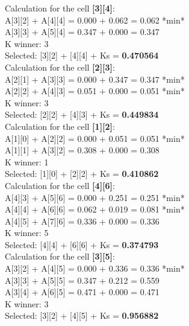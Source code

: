 \documentclass[a4paper,twocolumn,10pt]{article}
\newcommand\tab[1][1cm]{\hspace*{#1}}
\newcommand\minitab[1][0.5cm]{\hspace*{#1}}
\begin{document}
Calculation for the cell \textbf{[3][4]}: \\ 
\tab A[3][2] + A[4][4] = 0.000 + 0.062 = 0.062 *min*\\ 
\tab A[3][3] + A[5][4] = 0.347 + 0.000 = 0.347\\ 
\minitab K winner: 3 \\ 
\minitab Selected: [3][2] + [4][4] + Ks = \textbf{0.470564} \\ 
 
Calculation for the cell \textbf{[2][3]}: \\ 
\tab A[2][1] + A[3][3] = 0.000 + 0.347 = 0.347 *min*\\ 
\tab A[2][2] + A[4][3] = 0.051 + 0.000 = 0.051 *min*\\ 
\minitab K winner: 3 \\ 
\minitab Selected: [2][2] + [4][3] + Ks = \textbf{0.449834} \\ 
 
Calculation for the cell \textbf{[1][2]}: \\ 
\tab A[1][0] + A[2][2] = 0.000 + 0.051 = 0.051 *min*\\ 
\tab A[1][1] + A[3][2] = 0.308 + 0.000 = 0.308\\ 
\minitab K winner: 1 \\ 
\minitab Selected: [1][0] + [2][2] + Ks = \textbf{0.410862} \\ 
 
Calculation for the cell \textbf{[4][6]}: \\ 
\tab A[4][3] + A[5][6] = 0.000 + 0.251 = 0.251 *min*\\ 
\tab A[4][4] + A[6][6] = 0.062 + 0.019 = 0.081 *min*\\ 
\tab A[4][5] + A[7][6] = 0.336 + 0.000 = 0.336\\ 
\minitab K winner: 5 \\ 
\minitab Selected: [4][4] + [6][6] + Ks = \textbf{0.374793} \\ 
 
Calculation for the cell \textbf{[3][5]}: \\ 
\tab A[3][2] + A[4][5] = 0.000 + 0.336 = 0.336 *min*\\ 
\tab A[3][3] + A[5][5] = 0.347 + 0.212 = 0.559\\ 
\tab A[3][4] + A[6][5] = 0.471 + 0.000 = 0.471\\ 
\minitab K winner: 3 \\ 
\minitab Selected: [3][2] + [4][5] + Ks = \textbf{0.956882} \\ 
 
\end{document}
